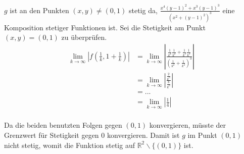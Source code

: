 \documentclass[10pt,a4paper]{scrartcl}
\newcommand{\R}{\mathbb{R}}
\begin{document}
$g$ ist an den Punkten $(x,y) \neq (0,1)$ stetig da, $\frac{x^4(y-1)^2+x^3(y-1)^3}{(x^2+(y-1)^2)^3}$ eine Komposition stetiger Funktionen ist. Sei die Stetigkeit am Punkt $(x,y) = (0,1)$ zu überprüfen.
\begin{align*}
\lim_{k \to \infty} \left| f(\frac{1}{k},1+\frac{1}{k}) \right|
 &= \lim_{k \to \infty} \left| \frac{\frac{1}{k^4}\frac{1}{k^2}+\frac{1}{k^3}\frac{1}{k^3}}{(\frac{1}{k^2}+\frac{1}{k^2})^3} \right| \\
 &= \lim_{k \to \infty} \left| \frac{\frac{2}{k^6}}{\frac{8}{k^6}} \right| \\
 &= ...\\
 &= \lim_{k \to \infty} \left| \frac{1}{4} \right| \\
\end{align*}


Da die beiden benutzten Folgen gegen $(0,1)$ konvergieren, müsste der Grenzwert für Stetigkeit gegen $0$ konvergieren.
Damit ist $g$ im Punkt $(0,1)$ nicht stetig, womit die Funktion stetig auf $\R^2 \backslash \{ (0,1)\}$ ist. \\
\end{document}
